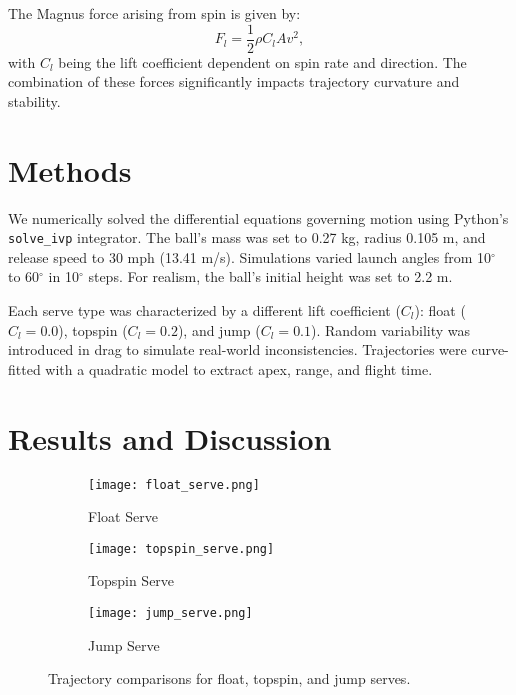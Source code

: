 \documentclass[11pt]{article}
\begin{document}
The Magnus force arising from spin is given by:
\begin{equation}
F_l = \frac{1}{2} \rho C_l A v^2,
\end{equation}
with $C_l$ being the lift coefficient dependent on spin rate and direction. The combination of these forces significantly impacts trajectory curvature and stability.

\section{Methods}

We numerically solved the differential equations governing motion using Python’s \texttt{solve\_ivp} integrator. The ball’s mass was set to 0.27 kg, radius 0.105 m, and release speed to 30 mph (13.41 m/s). Simulations varied launch angles from 10$^\circ$ to 60$^\circ$ in 10$^\circ$ steps. For realism, the ball's initial height was set to 2.2 m.

Each serve type was characterized by a different lift coefficient ($C_l$): float ($C_l=0.0$), topspin ($C_l=0.2$), and jump ($C_l=0.1$). Random variability was introduced in drag to simulate real-world inconsistencies. Trajectories were curve-fitted with a quadratic model to extract apex, range, and flight time.

\section{Results and Discussion}

\begin{figure}[htbp]
\centering
\begin{subfigure}[b]{0.45\textwidth}
    \centering
    \texttt{[image: float\_serve.png]}
    \caption{Float Serve}
    \label{fig:float_serve}
\end{subfigure}

\vspace{0.5cm}

\begin{subfigure}[b]{0.45\textwidth}
    \centering
    \texttt{[image: topspin\_serve.png]}
    \caption{Topspin Serve}
    \label{fig:topspin_serve}
\end{subfigure}

\vspace{0.5cm}

\begin{subfigure}[b]{0.45\textwidth}
    \centering
    \texttt{[image: jump\_serve.png]}
    \caption{Jump Serve}
    \label{fig:jump_serve}
\end{subfigure}


\caption{Trajectory comparisons for float, topspin, and jump serves.}
\label{fig:serve_comparison}
\end{figure}
\end{document}
